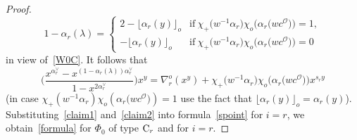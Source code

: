 \begin{proof}
\begin{equation*}
1-\alpha_r(\lambda)=
\begin{cases}
2-\lfloor\alpha_r(y)\rfloor_o &\text{if}\ \chi_+\bigl(w^{-1}\alpha_r\bigr)\chi_o\bigl(\alpha_r\bigl(wc^\mathcal{O}\bigr)\bigr)=1,\\
-\lfloor\alpha_r(y)\rfloor_o &\text{if}\ \chi_+\bigl(w^{-1}\alpha_r\bigr)\chi_o\bigl(\alpha_r\bigl(wc^\mathcal{O}\bigr)\bigr)=0
\end{cases}
\end{equation*}
in view of~\eqref{W0C}. It follows that
\begin{equation}\label{claim2}
\Biggl(\frac{x^{\alpha_r^\vee}-x^{(1-\alpha_r(\lambda))\alpha_r^\vee}}{1-x^{2\alpha_r^\vee}}\Biggr)x^y=
\nabla_r^o(x^y)+
\chi_+\bigl(w^{-1}\alpha_r\bigr)\chi_o\bigl(\alpha_r\bigl(wc^\mathcal{O}\bigr)\bigr)
x^{s_ry}
\end{equation}
(in case $\chi_+(w^{-1}\alpha_r)\chi_o(\alpha_r\bigl(wc^\mathcal{O}\bigr))=1$ use the fact that $\lfloor\alpha_r(y)\rfloor_o=\alpha_r(y)$).
Substituting~\eqref{claim1} and~\eqref{claim2} into formula~\eqref{spoint} for $i=r$, we obtain~\eqref{formula} for $\Phi_0$ of type ${\rm C}_r$ and for $i=r$.


\end{proof}
